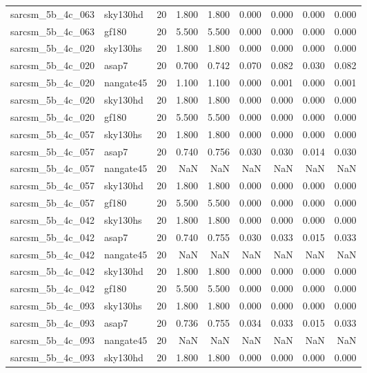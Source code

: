\begin{tabular}{llrrrrrrr}
sarcsm\_5b\_4c\_063 & sky130hd & 20 & 1.800 & 1.800 & 0.000 & 0.000 & 0.000 & 0.000 \\
sarcsm\_5b\_4c\_063 & gf180 & 20 & 5.500 & 5.500 & 0.000 & 0.000 & 0.000 & 0.000 \\
sarcsm\_5b\_4c\_020 & sky130hs & 20 & 1.800 & 1.800 & 0.000 & 0.000 & 0.000 & 0.000 \\
sarcsm\_5b\_4c\_020 & asap7 & 20 & 0.700 & 0.742 & 0.070 & 0.082 & 0.030 & 0.082 \\
sarcsm\_5b\_4c\_020 & nangate45 & 20 & 1.100 & 1.100 & 0.000 & 0.001 & 0.000 & 0.001 \\
sarcsm\_5b\_4c\_020 & sky130hd & 20 & 1.800 & 1.800 & 0.000 & 0.000 & 0.000 & 0.000 \\
sarcsm\_5b\_4c\_020 & gf180 & 20 & 5.500 & 5.500 & 0.000 & 0.000 & 0.000 & 0.000 \\
sarcsm\_5b\_4c\_057 & sky130hs & 20 & 1.800 & 1.800 & 0.000 & 0.000 & 0.000 & 0.000 \\
sarcsm\_5b\_4c\_057 & asap7 & 20 & 0.740 & 0.756 & 0.030 & 0.030 & 0.014 & 0.030 \\
sarcsm\_5b\_4c\_057 & nangate45 & 20 & NaN & NaN & NaN & NaN & NaN & NaN \\
sarcsm\_5b\_4c\_057 & sky130hd & 20 & 1.800 & 1.800 & 0.000 & 0.000 & 0.000 & 0.000 \\
sarcsm\_5b\_4c\_057 & gf180 & 20 & 5.500 & 5.500 & 0.000 & 0.000 & 0.000 & 0.000 \\
sarcsm\_5b\_4c\_042 & sky130hs & 20 & 1.800 & 1.800 & 0.000 & 0.000 & 0.000 & 0.000 \\
sarcsm\_5b\_4c\_042 & asap7 & 20 & 0.740 & 0.755 & 0.030 & 0.033 & 0.015 & 0.033 \\
sarcsm\_5b\_4c\_042 & nangate45 & 20 & NaN & NaN & NaN & NaN & NaN & NaN \\
sarcsm\_5b\_4c\_042 & sky130hd & 20 & 1.800 & 1.800 & 0.000 & 0.000 & 0.000 & 0.000 \\
sarcsm\_5b\_4c\_042 & gf180 & 20 & 5.500 & 5.500 & 0.000 & 0.000 & 0.000 & 0.000 \\
sarcsm\_5b\_4c\_093 & sky130hs & 20 & 1.800 & 1.800 & 0.000 & 0.000 & 0.000 & 0.000 \\
sarcsm\_5b\_4c\_093 & asap7 & 20 & 0.736 & 0.755 & 0.034 & 0.033 & 0.015 & 0.033 \\
sarcsm\_5b\_4c\_093 & nangate45 & 20 & NaN & NaN & NaN & NaN & NaN & NaN \\
sarcsm\_5b\_4c\_093 & sky130hd & 20 & 1.800 & 1.800 & 0.000 & 0.000 & 0.000 & 0.000 \\

\end{tabular}
